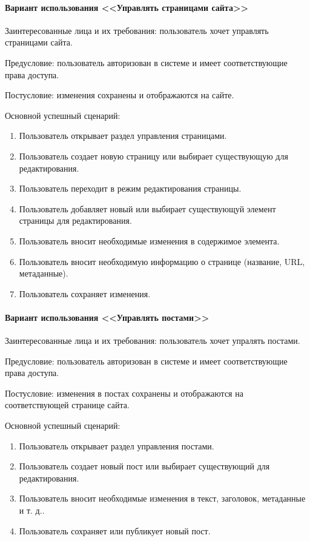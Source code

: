 \paragraph{Вариант использования <<Управлять страницами сайта>>}
Заинтересованные лица и их требования: пользователь хочет управлять страницами сайта.

Предусловие: пользователь авторизован в системе и имеет соответствующие права доступа.

Постусловие: изменения сохранены и отображаются на сайте.

Основной успешный сценарий:
\begin{enumerate}
	\item Пользователь открывает раздел управления страницами.
	\item Пользователь создает новую страницу или выбирает существующую для редактирования.
	\item Пользователь переходит в режим редактирования страницы.
	\item Пользователь добавляет новый или выбирает существующуй элемент страницы для редактирования.
	\item Пользователь вносит необходимые изменения в содержимое элемента.
	\item Пользователь вносит необходимую информацию о странице (название, URL, метаданные).
	\item Пользователь сохраняет изменения.
\end{enumerate}

\paragraph{Вариант использования <<Управлять постами>>}
Заинтересованные лица и их требования: пользователь хочет упралять постами.

Предусловие: пользователь авторизован в системе и имеет соответствующие права доступа.

Постусловие: изменения в постах сохранены и отображаются на соответствующей странице сайта.

Основной успешный сценарий:
\begin{enumerate}
	\item Пользователь открывает раздел управления постами.
	\item Пользователь создает новый пост или выбирает существующий для редактирования.
	\item Пользователь вносит необходимые изменения в текст, заголовок, метаданные и т. д..
	\item Пользователь сохраняет или публикует новый пост.
\end{enumerate}

